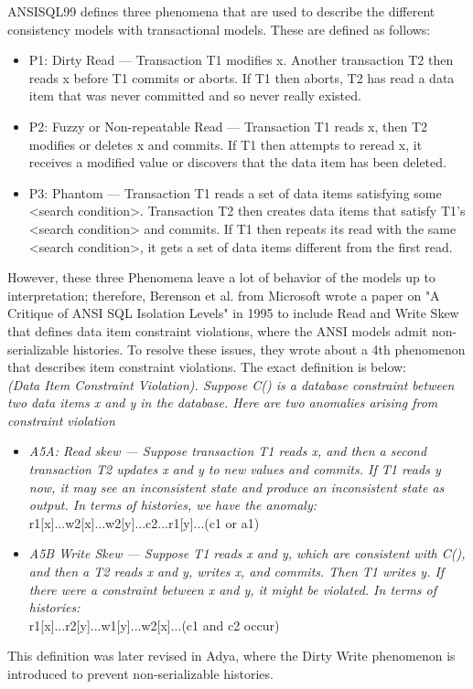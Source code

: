 \documentclass[a4paper,10pt,titlepage]{report}
\begin{document}
   ANSISQL99\cite{ansisql1999} defines three phenomena that are used to describe the different consistency models with transactional models. These are defined as follows:
    \begin{itemize}
        \item P1: Dirty Read — Transaction T1 modifies x. Another transaction T2 then reads x before T1 commits or aborts. If T1 then aborts, T2 has read a data item that was never committed and so never really existed.
        \item P2: Fuzzy or Non-repeatable Read — Transaction T1 reads x, then T2 modifies or deletes x and commits. If T1 then attempts to reread x, it receives a modified value or discovers that the data item has been deleted.
        \item P3: Phantom — Transaction T1 reads a set of data items satisfying some <search condition>. Transaction T2 then creates data items that satisfy T1's <search condition> and commits. If T1 then repeats its read with the same <search condition>, it gets a set of data items different from the first read.
    \end{itemize}


    However, these three Phenomena leave a lot of behavior of the models up to interpretation; therefore, Berenson et al\cite{Berensonetal}. from Microsoft wrote a paper on "A Critique of ANSI SQL Isolation Levels" in 1995 to include Read and Write Skew that defines data item constraint violations, where the ANSI models admit non-serializable histories. To resolve these issues, they wrote about a 4th phenomenon that describes item constraint violations. The exact definition is below: \\
\textit{(Data Item Constraint Violation). Suppose C() is a database constraint between two data items x and y in the database. Here are two anomalies arising from constraint violation}\\
    \begin{itemize}
        \item \textit{A5A: Read skew — Suppose transaction T1 reads x, and then a second transaction T2 updates x and y to new values and commits. If T1 reads y now, it may see an inconsistent state and produce an inconsistent state as output.
        In terms of histories, we have the anomaly:  } \\
         r1[x]...w2[x]...w2[y]...c2...r1[y]...(c1 or a1)
        \item \textit{A5B Write Skew — Suppose T1 reads x and y, which are
        consistent with C(), and then a T2 reads x and y, writes x,
            and commits. Then T1 writes y. If there were a constraint
            between x and y, it might be violated. In terms of histories:} \\
        r1[x]...r2[y]...w1[y]...w2[x]...(c1 and c2 occur)
    \end{itemize}
    This definition was later revised in Adya, \cite{Adya99weakconsistency} where the Dirty Write phenomenon is introduced to prevent non-serializable histories.
\end{document}
